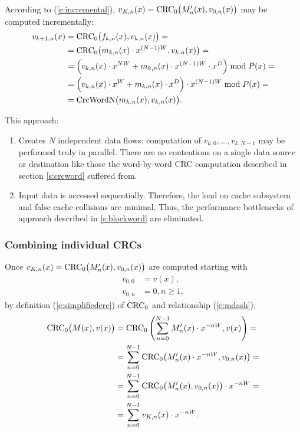\documentclass{article}
\begin{document}
According to (\ref{e:incremental}),
  $v_{K, n}(x) = {\rm CRC}_0\bigl(M'_n(x), v_{0, n}(x)\bigr)$
may be computed incrementally:
  \begin{align}
    v_{k+1, n}(x)
      &= {\rm CRC}_0\bigl(f_{k, n}(x), v_{k, n}(x)\bigr) = \nonumber \\
      &= {\rm CRC}_0\bigl(m_{k, n}(x) \cdot x^{(N-1)W}, v_{k, n}(x)\bigr) = \nonumber \\
      &= \Bigl(v_{k, n}(x) \cdot x^{NW} + m_{k, n}(x) \cdot x^{(N-1)W} \cdot x^D \Bigr) \bmod P(x) = \nonumber \\
      &= \Bigl(v_{k, n}(x) \cdot x^W + m_{k, n}(x) \cdot x^D \Bigr) \cdot x^{(N-1)W} \bmod P(x) = \label{e:crcwordnmultiply} \\
      &= \mbox{CrcWordN}\bigl(m_{k, n}(x), v_{k, n}(x)\bigr). \label{e:crcwordn}
  \end{align}

This approach:
\begin{enumerate}
\item
  Creates $N$ independent data flows: computation of $v_{k, 0}, \ldots,
  v_{k, N-1}$ may be performed truly in parallel. There are no contentions
  on a single data source or destination like those the word-by-word CRC
  computation described in section \ref{s:crcword} suffered from.
\item
  Input data is accessed sequentially. Therefore, the load on cache
  subsystem and false cache collisions are  minimal. Thus, the performance
  bottlenecks of approach described in \ref{s:blockword} are eliminated.
\end{enumerate}


\subsubsection{Combining individual CRCs} \label{s:combine}

Once $v_{K, n}(x) = {\rm CRC}_0\bigl(M'_n(x), v_{0, n}(x)\bigr)$ are computed starting with
  \begin{align*}
    v_{0, 0} &= v(x), \\
    v_{0, n} &= 0, n \geq 1,
  \end{align*}
by definition (\ref{e:simplifiedcrc}) of ${\rm CRC}_0$ and relationship (\ref{e:mdash}),
  \begin{align}
    {\rm CRC}_0\bigl(M(x), v(x)\bigr)
      &= {\rm CRC}_0\left(\sum_{n=0}^{N-1} M'_n(x) \cdot x^{-nW}, v(x)\right) = \nonumber \\
      &= \sum_{n=0}^{N-1} {\rm CRC}_0\bigl(M'_n(x) \cdot x^{-nW}, v_{0, n}(x) \bigr) = \nonumber \\
      &= \sum_{n=0}^{N-1} {\rm CRC}_0\bigl(M'_n(x), v_{0, n}(x) \bigr) \cdot x^{-nW} = \nonumber \\
      &= \sum_{n=0}^{N-1} v_{K, n}(x) \cdot x^{-nW}. \label{e:multiwordcrc1}
  \end{align}
\end{document}
